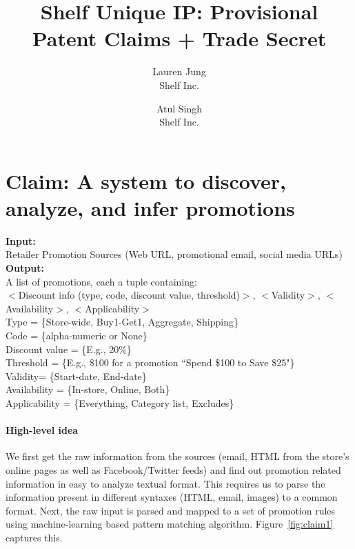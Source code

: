 \documentclass[11pt]{article}
\title{Shelf Unique IP: Provisional Patent Claims + Trade Secret}
\author{Lauren Jung\\Shelf Inc. \and Atul Singh\\Shelf Inc.}
\date{} %
\begin{document}
\maketitle


\section{Claim: A system to discover, analyze, and infer promotions}

\textbf{Input:}\\
Retailer Promotion Sources (Web URL, promotional email, social media URLs)\\

\noindent
\textbf{Output:}\\ A list of promotions, each a tuple containing:\\
$<$Discount info (type, code, discount value, threshold)$>$, $<$Validity$>$, $<$Availability$>$, $<$Applicability$>$\\

\noindent
Type = \{Store-wide, Buy1-Get1, Aggregate, Shipping\}\\
Code = \{alpha-numeric or None\}\\
Discount value = \{E.g., 20\%\}\\
Threshold = \{E.g., \$100 for a promotion ``Spend \$100 to Save \$25"\}\\
Validity= \{Start-date, End-date\}\\
Availability = \{In-store, Online, Both\}\\
Applicability = \{Everything, Category list, Excludes\}\\


\paragraph{High-level idea}
We first get the raw information from the sources (email, HTML from the store's online pages as well as Facebook/Twitter feeds) and find out promotion related information in 
easy to analyze textual format. This requires us to parse the information present in different syntaxes (HTML, email, images)
to a common format. Next, the raw input is parsed and mapped to a set of promotion rules using machine-learning based pattern matching
algorithm. Figure~\ref{fig:claim1} captures this.
\end{document}
